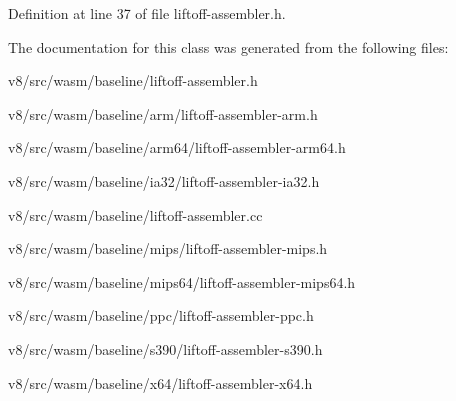 Definition at line 37 of file liftoff-\/assembler.\+h.



The documentation for this class was generated from the following files\+:\begin{DoxyCompactItemize}
\item 
v8/src/wasm/baseline/liftoff-\/assembler.\+h\item 
v8/src/wasm/baseline/arm/liftoff-\/assembler-\/arm.\+h\item 
v8/src/wasm/baseline/arm64/liftoff-\/assembler-\/arm64.\+h\item 
v8/src/wasm/baseline/ia32/liftoff-\/assembler-\/ia32.\+h\item 
v8/src/wasm/baseline/liftoff-\/assembler.\+cc\item 
v8/src/wasm/baseline/mips/liftoff-\/assembler-\/mips.\+h\item 
v8/src/wasm/baseline/mips64/liftoff-\/assembler-\/mips64.\+h\item 
v8/src/wasm/baseline/ppc/liftoff-\/assembler-\/ppc.\+h\item 
v8/src/wasm/baseline/s390/liftoff-\/assembler-\/s390.\+h\item 
v8/src/wasm/baseline/x64/liftoff-\/assembler-\/x64.\+h\end{DoxyCompactItemize}
